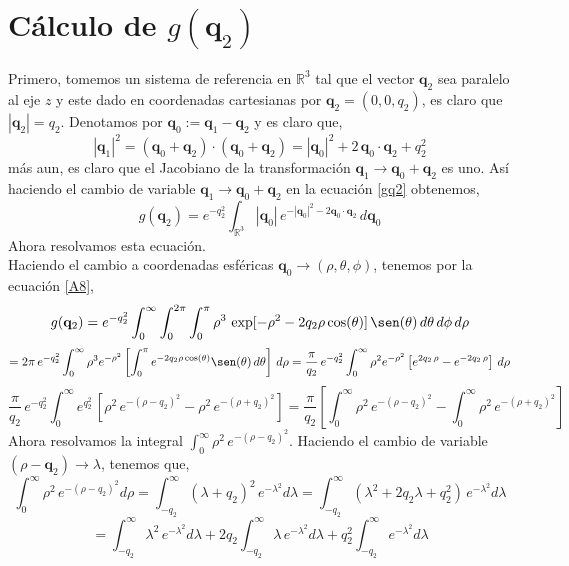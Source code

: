 \documentclass[12pt]{book}
\numberwithin{equation}{chapter}
\def\q{\mathbf{q}}
\def\R{\mathbb{R}}
\def\t{\theta}
\def\r{\rho}
\def\p{\phi}
\def\l{\lambda}
\begin{document}
\section{C\'alculo de $g(\q_{2})$}
Primero, tomemos un sistema de referencia en $\R^{3}$ tal que el vector $\q_{2}$ sea paralelo al eje $z$ y este dado en coordenadas cartesianas por $\q_{2}=(0,0,q_{2})$, es claro que $|\q_{2}|=q_{2}$. Denotamos por $\q_{0} := \q_{1} - \q_{2}$ y es claro que,
\begin{equation}
|\q_{1}|^{2}=(\q_{0}+\q_{2}) \cdot (\q_{0}+\q_{2}) =|\q_{0}|^{2} + 2\, \q_{0} \cdot \q_{2} + q_{2}^{2}
\end{equation}
m\'as aun, es claro que el Jacobiano de la transformaci\'on $ \q_{1} \rightarrow \q_{0} + \q_{2} $ es uno. As\'i haciendo el cambio de variable $ \q_{1} \rightarrow \q_{0} + \q_{2} $ en la ecuaci\'on \eqref{gq2} obtenemos,
\begin{equation}
g(\q_{2})= e^{-q_{2}^{2}} \int_{\R^{3}} |\q_{0}|\, e^{-|\q_{0}|^{2} -2 \q_{0} \cdot \q_{2}} \,d\q_{0}
\end{equation}
Ahora resolvamos esta ecuaci\'on.\\
Haciendo el cambio a coordenadas esf\'ericas $\q_{0} \rightarrow (\r,\t,\p)$, tenemos por la ecuaci\'on \eqref{A8},
$$ g(\q_{2})= e^{-q_{2}^{2}} \int_{0}^{\infty} \int_{0}^{2\pi} \int_{0}^{\pi} \r^{3} \, \exp[-\r^{2}-2q_{2} \r \cos(\t)] \,  \sen(\t) \, d\t \, d\p \, d\r $$
$$= 2\pi \, e^{-q_{2}^{2}} \int_{0}^{\infty} \r^{3}e^{-\r^{2}} \left[\int_{0}^{\pi} e^{-2q_{2} \r \cos(\t)} \sen(\t) \, d\t \right] \, d\r= \frac{\pi}{q_{2}} \, e^{-q_{2}^{2}} \int_{0}^{\infty} \r^{2} e^{-\r^{2}} \left[ e^{2q_{2}\,\r} - e^{-2q_{2}\,\r} \right]\, d\r  $$
\begin{equation}\label{gq22}
\frac{\pi}{q_{2}} \, e^{-q_{2}^{2}} \int_{0}^{\infty} e^{q_{2}^{2}}\, \left[ \r^{2} \, e^{-(\r - q_{2})^{2}} - \r^{2} \, e^{-(\r + q_{2})^{2}} \right] = \frac{\pi}{q_{2}} \left[ \int_{0}^{\infty} \r^{2} \, e^{-(\r - q_{2})^{2}} - \int_{0}^{\infty} \r^{2} \, e^{-(\r + q_{2})^{2}} \right]
\end{equation}
Ahora resolvamos la integral $\int_{0}^{\infty} \r^{2} \, e^{-(\r - q_{2})^{2}}$. Haciendo el cambio de variable $(\r-\q_{2}) \rightarrow \l$, tenemos que,
$$ \int_{0}^{\infty} \r^{2} \, e^{-(\r - q_{2})^{2}} d\r = \int_{-q_{2}}^{\infty} (\l + q_{2})^{2}\, e^{-\l^{2}} d\l = \int_{-q_{2}}^{\infty} (\l^{2}+2q_{2}\l+q_{2}^{2}) \, e^{-\l^{2}} d\l $$
\begin{equation}\label{ints}
= \int_{-q_{2}}^{\infty}\l^{2} \, e^{-\l^{2}} d\l + 2q_{2} \int_{-q_{2}}^{\infty} \l \, e^{-\l^{2}} d\l + q_{2}^{2} \int_{-q_{2}}^{\infty}  e^{-\l^{2}} d\l
\end{equation}
\end{document}
